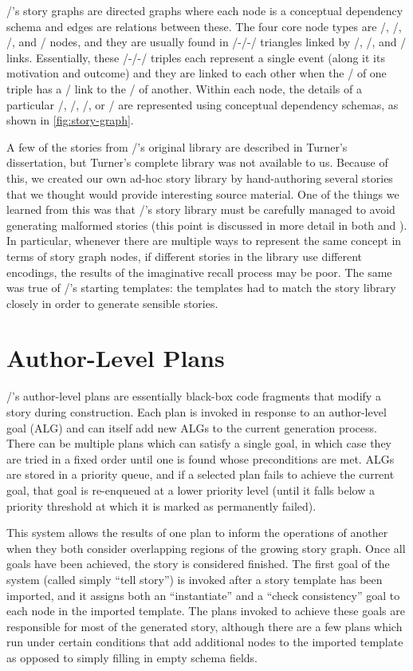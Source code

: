 \minstrel/'s story graphs are directed graphs where each node is a conceptual dependency schema and edges are relations between these.
%
The four core node types are \gng/, \gna/, \gns/, and \gnb/ nodes, and they are usually found in \gng/-\gna/-\gns/ triangles linked by \gep/, \gei/, and \gea/ links.
%
Essentially, these \gng/-\gna/-\gns/ triples each represent a single event (along it its motivation and outcome) and they are linked to each other when the \gns/ of one triple has a \gem/ link to the \gng/ of another.
%
Within each node, the details of a particular \gng/, \gna/, \gns/, or \gnb/ are represented using conceptual dependency schemas, as shown in \cref{fig:story-graph}.


A few of the stories from \minstrel/'s original library are described in Turner's dissertation, but Turner's complete library was not available to us.
%
Because of this, we created our own ad-hoc story library by hand-authoring several stories that we thought would provide interesting source material.
%
One of the things we learned from this was that \minstrel/'s story library must be carefully managed to avoid generating malformed stories (this point is discussed in more detail in both \citep{Tearse2012} and \citep{Tearse2014}).
%
In particular, whenever there are multiple ways to represent the same concept in terms of story graph nodes, if different stories in the library use different encodings, the results of the imaginative recall process may be poor.
%
The same was true of \minstrel/'s starting templates: the templates had to match the story library closely in order to generate sensible stories.


\section{Author-Level Plans}

\minstrel/'s author-level plans are essentially black-box code fragments that modify a story during construction.
%
Each plan is invoked in response to an author-level goal (ALG) and can itself add new ALGs to the current generation process.
%
There can be multiple plans which can satisfy a single goal, in which case they are tried in a fixed order until one is found whose preconditions are met.
%
ALGs are stored in a priority queue, and if a selected plan fails to achieve the current goal, that goal is re-enqueued at a lower priority level (until it falls below a priority threshold at which it is marked as permanently failed).


This system allows the results of one plan to inform the operations of another when they both consider overlapping regions of the growing story graph.
%
Once all goals have been achieved, the story is considered finished.
%
The first goal of the system (called simply ``tell story'') is invoked after a story template has been imported, and it assigns both an ``instantiate'' and a ``check consistency'' goal to each node in the imported template.
%
The plans invoked to achieve these goals are responsible for most of the generated story, although there are a few plans which run under certain conditions that add additional nodes to the imported template as opposed to simply filling in empty schema fields.


